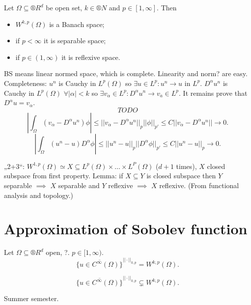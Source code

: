 \documentclass[12pt]{article}					%
\begin{document}
\begin{veta}
	Let $\Omega \subseteq ®R^d$ be open set, $k \in ®N$ and $p \in [1, ∞]$. Then

	\begin{itemize}
		\item $W^{k, p}(\Omega)$ is a Banach space;
		\item if $p < ∞$ it is separable space;
		\item if $p \in (1, ∞)$ it is reflexive space.
	\end{itemize}

	\begin{dukazin}
		BS means linear normed space, which is complete. Linearity and norm? are easy. Completeness: $u^n$ is Cauchy in $L^p(\Omega)$ so $\exists u \in L^p: u^n \rightarrow u$ in $L^p$. $D^\alpha u^n$ is Cauchy in $L^p(\Omega)$ $\forall |\alpha| < k$ so $\exists v_\alpha \in L^p: D^\alpha u^n \rightarrow v_a \in L^p$. It remains prove that $D^\alpha u = v_\alpha$.
		$$ TODO $$
		$$ |\int_\Omega (v_\alpha - D^\alpha u^n) \phi| ≤ ||v_\alpha - D^\alpha u^n||_p ||\phi||_{p'} ≤ C ||v_\alpha - D^\alpha u^n|| \rightarrow 0. $$
		$$ |\int_\Omega (u^n - u) D^\alpha \phi| ≤ ||u^n - u||_p ||D^\alpha \phi||_{p'} ≤ C ||u^n - u||_p \rightarrow 0. $$

		„2+3“: $W^{1, p}(\Omega) \simeq X \subseteq L^p(\Omega) \times … \times L^P(\Omega)$ ($d+1$ times), $X$ closed subspace from first property. Lemma: if $X \subseteq Y$ is closed subspace then $Y$ separable $\implies$ $X$ separable and $Y$ reflexive $\implies$ $X$ reflexive. (From functional analysis and topology.)
	\end{dukazin}
\end{veta}

\section{Approximation of Sobolev function}
\begin{veta}
	Let $\Omega \subseteq ®R^d$ open, ?. $p \in [1, ∞)$.
	$$ \overline{\{u \in C^∞(\Omega)\}}^{||·||_{k, p}} = W^{k, p}(\Omega). $$

	\begin{upozorneni}
		$$ \overline{\{u \in C^∞(\Omega)\}}^{||·||_{k, p}} \subsetneq W^{k, p}(\Omega). $$
	\end{upozorneni}

	\begin{dukazin}
		Summer semester.
	\end{dukazin}
\end{veta}
\end{document}
